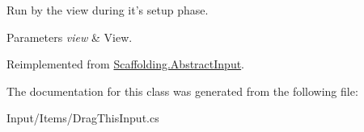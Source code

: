 Run by the view during it's setup phase. 


\begin{DoxyParams}{Parameters}
{\em view} & View.\\
\hline
\end{DoxyParams}


Reimplemented from \hyperlink{class_scaffolding_1_1_abstract_input_a598859c6342920d2b0c985310e6e9476}{Scaffolding.\-Abstract\-Input}.



The documentation for this class was generated from the following file\-:\begin{DoxyCompactItemize}
\item 
Input/\-Items/Drag\-This\-Input.\-cs\end{DoxyCompactItemize}
